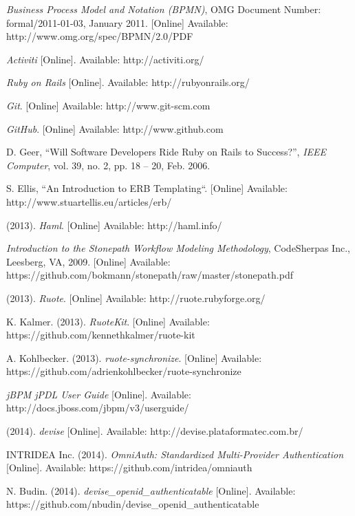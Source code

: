\renewcommand{\bibname}{References}
\begin{thebibliography}{99}

\raggedright

\textit{Business Process Model and Notation
(BPMN)}, OMG Document Number: formal/2011-01-03, January 2011. [Online] Available: http://www.omg.org/spec/BPMN/2.0/PDF

\textit{Activiti} [Online]. Available: http://activiti.org/

\textit{Ruby on Rails} [Online]. Available: http://rubyonrails.org/

\textit{Git}. [Online] Available: http://www.git-scm.com

\textit{GitHub}. [Online] Available: http://www.github.com

D. Geer, ``Will Software Developers Ride Ruby on Rails to Success?'', \textit{IEEE Computer}, vol. 39, no. 2, pp. 18 -- 20, Feb. 2006.

S. Ellis, ``An Introduction to ERB Templating``. [Online] Available: http://www.stuartellis.eu/articles/erb/

(2013). \textit{Haml}. [Online] Available: http://haml.info/

\textit{Introduction to the Stonepath Workflow Modeling Methodology},
CodeSherpas Inc., Leesberg, VA, 2009. [Online] Available: https://github.com/bokmann/stonepath/raw/master/stonepath.pdf

(2013). \textit{Ruote}. [Online] Available: http://ruote.rubyforge.org/

K. Kalmer. (2013). \textit{RuoteKit}. [Online] Available: https://github.com/kennethkalmer/ruote-kit

A. Kohlbecker. (2013). \textit{ruote-synchronize}. [Online] Available: https://github.com/adrienkohlbecker/ruote-synchronize

\textit{jBPM jPDL User Guide} [Online]. Available: http://docs.jboss.com/jbpm/v3/userguide/

(2014). \textit{devise} [Online]. Available: http://devise.plataformatec.com.br/

INTRIDEA Inc. (2014). \textit{OmniAuth: Standardized Multi-Provider Authentication} [Online]. Available: https://github.com/intridea/omniauth

N. Budin. (2014). \textit{devise\_openid\_authenticatable} [Online]. Available: https://github.com/nbudin/devise\_openid\_authenticatable


\end{thebibliography}
